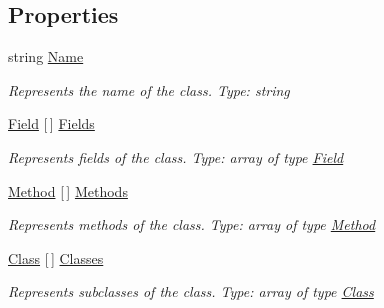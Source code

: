 \subsection*{Properties}
\begin{DoxyCompactItemize}
\item 
string \mbox{\hyperlink{classCodeGen_1_1generators_1_1Class_a4b4e4edea7c310e412795773ab3bc4ce}{Name}}
\begin{DoxyCompactList}\small\item\em Represents the name of the class. Type\+: string \end{DoxyCompactList}\item 
\mbox{\hyperlink{classCodeGen_1_1generators_1_1Field}{Field}} \mbox{[}$\,$\mbox{]} \mbox{\hyperlink{classCodeGen_1_1generators_1_1Class_a026939be979811f080b259f86b70b063}{Fields}}
\begin{DoxyCompactList}\small\item\em Represents fields of the class. Type\+: array of type \mbox{\hyperlink{classCodeGen_1_1generators_1_1Field}{Field}} \end{DoxyCompactList}\item 
\mbox{\hyperlink{classCodeGen_1_1generators_1_1Method}{Method}} \mbox{[}$\,$\mbox{]} \mbox{\hyperlink{classCodeGen_1_1generators_1_1Class_a96293c19a6d972cb1aa79200dcd20f8f}{Methods}}
\begin{DoxyCompactList}\small\item\em Represents methods of the class. Type\+: array of type \mbox{\hyperlink{classCodeGen_1_1generators_1_1Method}{Method}} \end{DoxyCompactList}\item 
\mbox{\hyperlink{classCodeGen_1_1generators_1_1Class}{Class}} \mbox{[}$\,$\mbox{]} \mbox{\hyperlink{classCodeGen_1_1generators_1_1Class_abb066e6c74da085859bcb0744ee2e0a0}{Classes}}
\begin{DoxyCompactList}\small\item\em Represents subclasses of the class. Type\+: array of type \mbox{\hyperlink{classCodeGen_1_1generators_1_1Class}{Class}} \end{DoxyCompactList}\item 

\end{DoxyCompactItemize}
